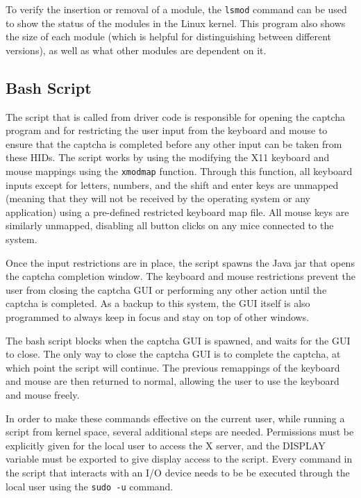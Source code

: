 \documentclass[pagenumbers]{ieee}
\begin{document}
To verify the insertion or removal of a module, the \texttt{lsmod} command can be used to show the status of the modules in the Linux kernel. This program also shows the size of each module (which is helpful for distinguishing between different versions), as well as what other modules are dependent on it.


\subsection{Bash Script}
\label{section:bash}

The script that is called from driver code is responsible for opening the captcha program and for restricting the user input from the keyboard and mouse to ensure that the captcha is completed before any other input can be taken from these HIDs.  The script works by using the modifying the X11 keyboard and mouse mappings using the \texttt{xmodmap} function. Through this function, all keyboard inputs except for letters, numbers, and the shift and enter keys are unmapped (meaning that they will not be received by the operating system or any application) using a pre-defined restricted keyboard map file. All mouse keys are similarly unmapped, disabling all button clicks on any mice connected to the system. 

Once the input restrictions are in place, the script spawns the Java jar that opens the captcha completion window. The keyboard and mouse restrictions prevent the user from closing the captcha GUI or performing any other action until the captcha is completed. As a backup to this system, the GUI itself is also programmed to always keep in focus and stay on top of other windows.

The bash script blocks when the captcha GUI is spawned, and waits for the GUI to close. The only way to close the captcha GUI is to complete the captcha, at which point the script will continue. The previous remappings of the keyboard and mouse are then returned to normal, allowing the user to use the keyboard and mouse freely.

In order to make these commands effective on the current user, while running a script from kernel space, several additional steps are needed. Permissions must be explicitly given for the local user to access the X server, and the DISPLAY variable must be exported to give display access to the script.  Every command in the script that interacts with an I/O device needs to be be executed through the local user using the \texttt{sudo -u} command. 
\end{document}
